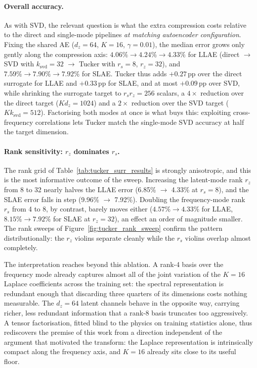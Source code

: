 ﻿\documentclass[a4paper,12pt]{article}
\theoremstyle{definition}
\theoremstyle{remark}
\begin{document}
\paragraph{Overall accuracy.}
As with SVD, the relevant question is what the extra compression costs relative to the direct and single-mode pipelines \emph{at matching autoencoder configuration}. Fixing the shared AE ($d_z=64$, $K=16$, $\gamma=0.01$), the median error grows only gently along the compression axis: $4.06\% \to 4.24\% \to 4.33\%$ for LLAE (direct $\to$ SVD with $k_{\mathrm{svd}}=32$ $\to$ Tucker with $r_s=8$, $r_z=32$), and $7.59\% \to 7.90\% \to 7.92\%$ for SLAE. Tucker thus adds $+0.27$\,pp over the direct surrogate for LLAE and $+0.33$\,pp for SLAE, and at most $+0.09$\,pp over SVD, while shrinking the surrogate target to $r_s r_z = 256$ scalars, a $4\times$ reduction over the direct target ($K d_z = 1024$) and a $2\times$ reduction over the SVD target ($K k_{\mathrm{svd}} = 512$). Factorising both modes at once is what buys this: exploiting cross-frequency correlations lets Tucker match the single-mode SVD accuracy at half the target dimension.

\paragraph{Rank sensitivity: $r_z$ dominates $r_s$.}
The rank grid of Table~\ref{tab:tucker_surr_results} is strongly anisotropic, and this is the most informative outcome of the sweep. Increasing the latent-mode rank $r_z$ from 8 to 32 nearly halves the LLAE error (6.85\% $\to$ 4.33\% at $r_s=8$), and the SLAE error falls in step (9.96\% $\to$ 7.92\%). Doubling the frequency-mode rank $r_s$ from 4 to 8, by contrast, barely moves either ($4.57\% \to 4.33\%$ for LLAE, $8.15\% \to 7.92\%$ for SLAE at $r_z=32$), an effect an order of magnitude smaller. The rank sweeps of Figure~\ref{fig:tucker_rank_sweep} confirm the pattern distributionally: the $r_z$ violins separate cleanly while the $r_s$ violins overlap almost completely.

The interpretation reaches beyond this ablation. A rank-4 basis over the frequency mode already captures almost all of the joint variation of the $K=16$ Laplace coefficients across the training set: the spectral representation is redundant enough that discarding three quarters of its dimensions costs nothing measurable. The $d_z=64$ latent channels behave in the opposite way, carrying richer, less redundant information that a rank-8 basis truncates too aggressively. A tensor factorisation, fitted blind to the physics on training statistics alone, thus rediscovers the premise of this work from a direction independent of the argument that motivated the transform: the Laplace representation is intrinsically compact along the frequency axis, and $K=16$ already sits close to its useful floor.
\end{document}
